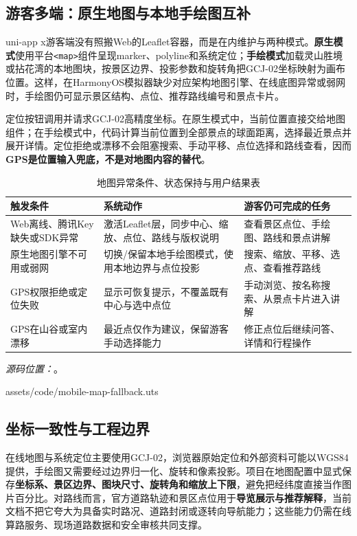 \newpage
\subsection{游客多端：原生地图与本地手绘图互补}

uni-app x游客端没有照搬Web的Leaflet容器，而是在内维护与两种模式。\textbf{原生模式}使用平台\texttt{<map>}组件呈现marker、polyline和系统定位；\textbf{手绘模式}加载灵山胜境或拈花湾的本地图块，按景区边界、投影参数和旋转角把GCJ-02坐标映射为画布位置。这样，在HarmonyOS模拟器缺少对应架构地图引擎、在线底图异常或弱网时，手绘图仍可显示景区结构、点位、推荐路线编号和景点卡片。

定位按钮调用并请求GCJ-02高精度坐标。在原生模式中，当前位置直接交给地图组件；在手绘模式中，代码计算当前位置到全部景点的球面距离，选择最近景点并展开详情。定位拒绝或漂移不会阻塞搜索、手动平移、点位选择和路线查看，因而\textbf{GPS是位置输入兜底，不是对地图内容的替代}。

\begin{table}[H]
  \centering
  \small
  \caption{地图异常条件、状态保持与用户结果表}\label{tab:map-degradation}
  \begin{tabularx}{\textwidth}{p{}p{}X}
    \toprule
    触发条件 & 系统动作 & 游客仍可完成的任务 \\
    \midrule
    Web离线、腾讯Key缺失或SDK异常 & 激活Leaflet层，同步中心、缩放、点位、路线与版权说明 & 查看景区点位、手绘图、路线和景点讲解 \\
    原生地图引擎不可用或弱网 & 切换/保留本地手绘图模式，使用本地边界与点位投影 & 搜索、缩放、平移、选点、查看推荐路线 \\
    GPS权限拒绝或定位失败 & 显示可恢复提示，不覆盖既有中心与选中点位 & 手动浏览、按名称搜索、从景点卡片进入讲解 \\
    GPS在山谷或室内漂移 & 最近点仅作为建议，保留游客手动选择能力 & 修正点位后继续问答、详情和行程操作 \\
    \bottomrule
  \end{tabularx}
\end{table}

\newpage
\noindent\textit{源码位置：}。

  {assets/code/mobile-map-fallback.uts}

\subsection{坐标一致性与工程边界}

在线地图与系统定位主要使用GCJ-02，浏览器原始定位和外部资料可能以WGS84提供，手绘图又需要经过边界归一化、旋转和像素投影。项目在地图配置中显式保存\textbf{坐标系、景区边界、图块尺寸、旋转角和缩放上下限}，避免把经纬度直接当作图片百分比。对路线而言，官方道路轨迹和景区点位用于\textbf{导览展示与推荐解释}，当前文档不把它夸大为具备实时路况、道路封闭或逐转向导航能力；这些能力仍需在线算路服务、现场道路数据和安全审核共同支撑。
